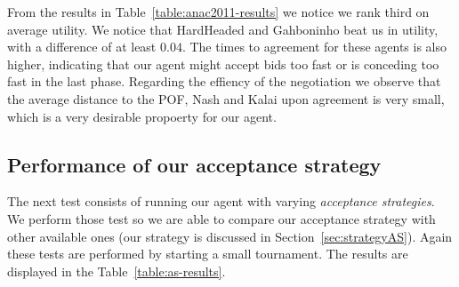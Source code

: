 From the results in Table~\ref{table:anac2011-results} we notice we rank third on average utility. 
We notice that HardHeaded and Gahboninho beat us in utility, with a difference of at least $0.04$. The times to agreement for these agents is also higher,
indicating that our agent might accept bids too fast or is conceding too fast in the last phase.
Regarding the effiency of the negotiation we observe that the average distance to the POF, Nash and Kalai upon agreement is very small,
which is a very desirable propoerty for our agent. 

\subsection{Performance of our acceptance strategy}

The next test consists of running our agent with varying \emph{acceptance strategies}. We perform those test so we are able to compare our acceptance strategy with other available ones (our strategy is discussed in Section~\ref{sec:strategyAS}). Again these tests are performed by starting a small tournament. The results are displayed in the Table~\ref{table:as-results}. \\

